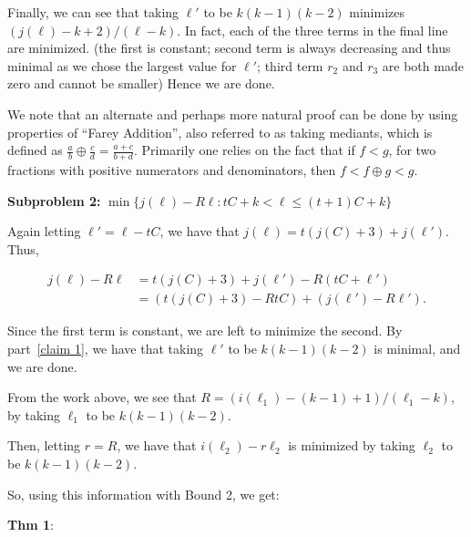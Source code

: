 \documentclass{article}
\newcommand{\dc}[1]{}%
\newcommand{\zh}[1]{}%
\begin{document}
Finally, we can see that taking $\ell'$ to be $k(k-1)(k-2)$ minimizes $(j(\ell)-k+2)/(\ell-k)$. In fact, each of the three terms in the final line are minimized. (the first is constant; second term is always decreasing and thus minimal as we chose the largest value for $\ell'$; third term $r_2$ and $r_3$ are both made zero and cannot be smaller) Hence we are done. 

\vspace{.75em}
We note that an alternate and perhaps more natural proof can be done by using properties of ``Farey Addition'', also referred to as taking mediants, which is defined as $\frac{a}{b}\oplus \frac{c}{d} = \frac{a+c}{b+d}$. Primarily one relies on the fact that if $f < g$, for two fractions with positive numerators and denominators, then $f < f \oplus g < g$.\dc{ maybe put this in a footnote and/or appendix}\zh{ footnote seems reasonable}

\vspace{1.75em}
\textbf{Subproblem 2:} $\min \{ j(\ell)-R\ell : tC+k <\ell\leq  (t+1)C+k\}$

Again letting $\ell' = \ell - tC$, we have that $j(\ell) = t(j(C)+3) +j(\ell')$. Thus,

\begin{align*}
    j(\ell)-R\ell &= t(j(C)+3) +j(\ell') - R(tC+\ell')\\
    &= (t(j(C)+3) - RtC) + (j(\ell') - R\ell').
\end{align*} 

 Since the first term is constant, we are left to minimize the second. By part~\ref{claim 1}\dc{ using ``step'' is confusing (reminds of the algorithm to construct $g_\ell$, not the previous claims). I would give the claim a name (lemma, proposition, whatever) to make it easier to backref}, we have that taking $\ell'$ to be $k(k-1)(k-2)$ is minimal, and we are done.

\vspace{1.75em}

From the work above, we see that $R = (i(\ell_1)-(k-1)+1)/(\ell_1-k)$, by taking $\ell_1$ to be $k(k-1)(k-2)$.

Then, letting $r=R$\dc{ Then what was the point in using $r$ at all? Just use $R$!}\zh{ yeah I should do this}, we have that $i(\ell_2)-r\ell_2$ is minimized by taking $\ell_2$ to be $k(k-1)(k-2)$.

So, using this information with Bound 2, we get:

\textbf{Thm\dc{amsthm, or at the very least write out ``theorem''} 1}:
\end{document}
